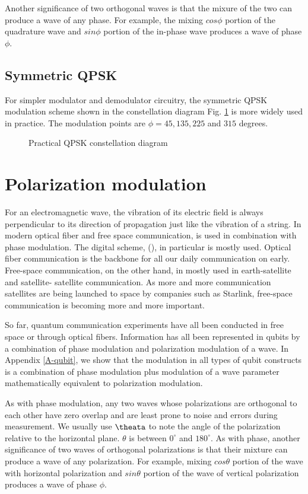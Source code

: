 \documentclass[Letter,11pt]{book}
\begin{document}
Another significance of two orthogonal waves is that the mixure of the two can produce a wave of any phase. For example, the mixing $cos\phi$ portion of the quadrature wave and $sin\phi$ portion of the in-phase wave produces a wave of phase $\phi$.

\subsection{Symmetric QPSK}
For simpler modulator and demodulator circuitry, the symmetric QPSK modulation scheme shown in the constellation diagram Fig. \ref{sQPSK} is more widely used in practice. The modulation points are $\phi = 45, 135, 225$ and $315$ degrees.
\begin{figure}[hb]\label{sQPSK}

\caption{Practical QPSK constellation diagram}
\end{figure}

\section{Polarization modulation}
For an electromagnetic wave, the vibration of its electric field is always perpendicular to its direction of propagation just like the vibration of a string. In modern optical fiber and free space communication,  is used in combination with phase modulation. The digital scheme,  (), in particular is mostly used. Optical fiber communication is the backbone for all our daily communication on early. Free-space communication, on the other hand, in mostly used in earth-satellite and satellite- satellite communication. As more and more communication satellites are being launched to space by companies such as Starlink, free-space communication is becoming more and more important.

So far, quantum communication experiments have all been conducted in free space or through optical fibers. Information has all been represented in qubits by a combination of phase modulation and polarization modulation of a wave. In Appendix \ref{A-qubit}, we show that the modulation in all types of qubit constructs is a combination of phase modulation plus modulation of a wave parameter mathematically equivalent to polarization modulation.

As with phase modulation, any two waves whose polarizations are orthogonal to each other have zero overlap and are least prone to noise and errors during measurement. We usually use $\theata$ to note the angle of the polarization relative to the horizontal plane. $\theta$ is between $0^\circ$ and $180^\circ$. As with phase, another significance of two waves of orthogonal polarizations is that their mixture can produce a wave of any polarization. For example, mixing $cos\theta$ portion of the wave with horizontal polarization and $sin\theta$ portion of the wave of vertical polarization produces a wave of phase $\phi$. 
\end{document}
